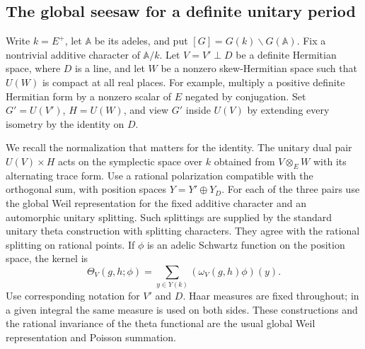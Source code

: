 \documentclass[a4paper,11pt]{article}
\theoremstyle{definition}
\theoremstyle{remark}
\numberwithin{equation}{section}
\begin{document}
\subsection{The global seesaw for a definite unitary period}\label{nav:I-39}
Write \(k=E^+\), let \(\mathbb A\) be its adeles, and put \([G]=G(k)\backslash G(\mathbb A)\). Fix a nontrivial additive character of \(\mathbb A/k\). Let \(V=V'\perp D\) be a definite Hermitian space, where \(D\) is a line, and let \(W\) be a nonzero skew-Hermitian space such that \(U(W)\) is compact at all real places. For example, multiply a positive definite Hermitian form by a nonzero scalar of \(E\) negated by conjugation. Set \(G'=U(V')\), \(H=U(W)\), and view \(G'\) inside \(U(V)\) by extending every isometry by the identity on \(D\).

We recall the normalization that matters for the identity. The unitary dual pair \(U(V)\times H\) acts on the symplectic space over \(k\) obtained from \(V\otimes_E W\) with its alternating trace form. Use a rational polarization compatible with the orthogonal sum, with position spaces \(Y=Y'\oplus Y_D\). For each of the three pairs use the global Weil representation for the fixed additive character and an automorphic unitary splitting. Such splittings are supplied by the standard unitary theta construction with splitting characters. They agree with the rational splitting on rational points. If \(\phi\) is an adelic Schwartz function on the position space, the kernel is
\[
 \Theta_V(g,h;\phi)=\sum_{y\in Y(k)}(\omega_V(g,h)\phi)(y).
\]
Use corresponding notation for \(V'\) and \(D\). Haar measures are fixed throughout; in a given integral the same measure is used on both sides. These constructions and the rational invariance of the theta functional are the usual global Weil representation and Poisson summation.~\cite{XIV-XI-IV-gan}
\end{document}
